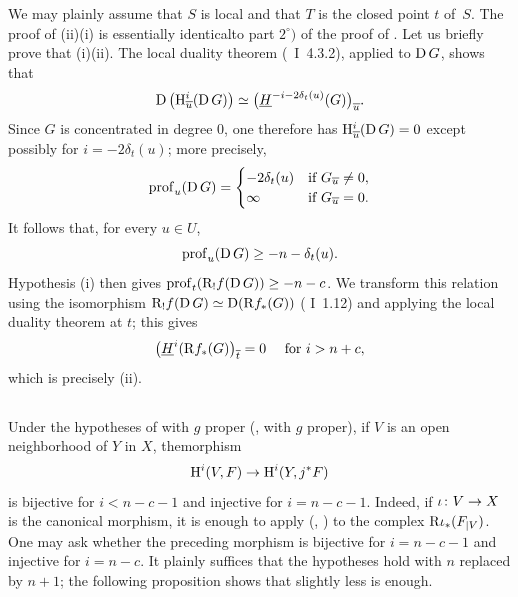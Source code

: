 We may plainly assume that $S$ is local and that $T$ is the closed point $t$ of~$S$. The proof of \textup{(ii)}\ALORS\textup{(i)} is essentially identical\pageoriginale to part $2^\circ)$ of the proof of . Let us briefly prove that \textup{(i)}\ALORS \textup{(ii)}. The local duality theorem (~I~4.3.2), applied to $\D G$, shows that
$$
\D\big(\H_{\overline{u}}^{i}(\D G)\big) \simeq\big(\underline{H}^{-i-2\delta_{t}(u)}(G)\big)_{\overline{u}}.
$$
Since $G$ is concentrated in degree $0$, one therefore has $\H_{\overline{u}}^{i}(\D G)=0$ except possibly for $i=-2\delta_{t}(u)$; more precisely,
{\[
\prof_{u}(\D G)=
\begin{cases}
-2\delta_{t}(u) &\text{if } G_{\overline{u}}\neq 0, \\
\infty &\text{if } G_{\overline{u}}=0.
\end{cases}
\]}
It follows that, for every $u\in U$,
$$
\prof_{u}(\D G)\geq -n-\delta_{t}(u).
$$
Hypothesis \textup{(i)} then gives $\prof_{t}(\R_{!}f(\D G))\geq -n-c$. We transform this relation using the isomorphism $\R_{!}f(\D G)\simeq\D(\R f_{\ast}(G))$ ( I~1.12) and applying the local duality theorem at $t$; this gives
$$
\big(\underline{H}^{i}(\R f_{\ast}(G)\big)_{\overline{t}}=0\quad\textrm{ for }i>n+c,
$$
which is precisely \textup{(ii)}.

\subsection{} \label{XIV.4.8} Under the hypotheses of  with $g$ proper (\resp {}, \resp {} with $g$ proper), if $V$ is an open neighborhood of $Y$ in $X$, the\pageoriginaled morphism
$$
\H^{i}(V, F)\to\H^{i}(Y, j^{\ast}F)$$
is bijective for $i<n-c-1$ and injective for $i=n-c-1$. Indeed, if $\sisi{i}{\iota}\colon V\to X$ is the canonical morphism, it is enough to apply  (\resp {}, \resp {}) to the complex $\R \sisi{i}{\iota}_{\ast}(\sisi{F{|V}}{F_{|V}})$. One may ask whether the preceding morphism is bijective for $i=n-c-1$ and injective for $i=n-c$. It plainly suffices that the hypotheses hold with $n$ replaced by $n+1$; the following proposition shows that slightly less is enough.

